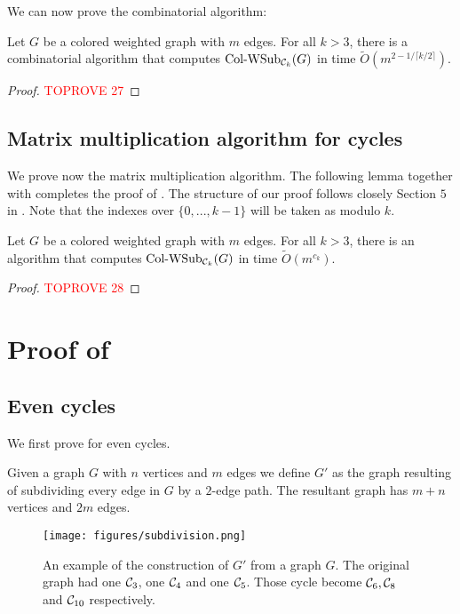 \documentclass[a4paper,UKenglish,cleveref, autoref, numberwithinsect, thm-restate]{lipics-v2021}
\newcommand{\cycle}[1]{\cC_{#1}}
\newcommand{\expandG}{G'}
\newcommand{\WSub}[2]{\mathrm{\text{Col-WSub}}_{#2}(#1)}
\newcommand{\cC}{{\cal C}}
\begin{document}
	We can now prove the combinatorial algorithm:
	
	\begin{lemma} \label{lem:wsub_cycles_comb}
		Let $G$ be a colored weighted graph with $m$ edges. For all $k>3$, there is a combinatorial algorithm that computes $\WSub{G}{\cycle{k}}$ in time $\tilde{O}(m^{2-1/\lceil k/2 \rceil })$.
	\end{lemma}
	\begin{proof}\textcolor{red}{TOPROVE 27}\end{proof}	
	
	\subsection{Matrix multiplication algorithm for cycles}
	
		We prove now the matrix multiplication algorithm. The following lemma together with  completes the proof of . The structure of our proof follows closely Section $5$ in \cite{GiLeSh+23}. Note that the indexes over $\{0,...,k-1\}$ will be taken as modulo $k$.
		
		\begin{lemma} \label{lem:wsub_cycles_mm}
		Let $G$ be a colored weighted graph with $m$ edges. For all $k>3$, there is an algorithm that computes $\WSub{G}{\cycle{k}}$ in time $\tilde{O}(m^{c_k})$.
		\end{lemma}
		\begin{proof}\textcolor{red}{TOPROVE 28}\end{proof}
	
	\section{Proof of }
		
		\subsection{Even cycles}
			We first prove  for even cycles.
			\begin{definition} 
				Given a graph $G$ with $n$ vertices and $m$ edges we define $\expandG$ as the graph resulting of subdividing every edge in $G$ by a $2$-edge path. The resultant graph has $m+n$ vertices and $2m$ edges.
			\end{definition}
		
		\begin{figure}
			\centering
			\texttt{[image: figures/subdivision.png]}\caption{An example of the construction of $\expandG$ from a graph $G$. The original graph had one $\cycle{3}$, one $\cycle{4}$ and one $\cycle{5}$. Those cycle become $\cycle{6},\cycle{8}$ and $\cycle{10}$ respectively.}
			\label{fig:subdivision}
		\end{figure}
		
\end{document}
